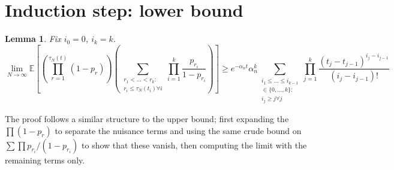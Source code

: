 \documentclass{article}
\newtheorem{lemma}{Lemma}
\newcommand{\E}{\mathbb{E}}
\newcommand{\1}[1]{\mathbbm{1}_{#1}}
\begin{document}
\section*{Induction step: lower bound}
\begin{lemma}\label{thm:induction_LB}
Fix $i_0=0$, $i_k=k$.
\begin{equation}
\lim_{N\to\infty} \E \left[ \left( \prod_{r=1}^{\tau_N(t)} (1-p_r) \right) \left( \sum_{\substack{r_1<\dots<r_k :\\ r_i\leq \tau_N(t_i) \forall i}} \prod_{i=1}^k \frac{p_{r_i}}{1-p_{r_i}} \right) \right] 
\geq e^{-\alpha_n t} \alpha_n^k \sum_{\substack{i_1\leq \dots\leq i_{k-1}\\ \in \{0,\dots,k\} :\\ i_j \geq j \forall j}} \prod_{j=1}^k \frac{(t_j - t_{j-1})^{i_j - i_{j-1}}}{(i_j - i_{j-1})! }
\end{equation}
\end{lemma}
The proof follows a similar structure to the upper bound; first expanding the $\prod (1-p_r)$ to separate the nuisance terms and using the same crude bound on $\sum \prod p_{r_i} / (1- p_{r_i})$ to show that these vanish, then computing the limit with the remaining terms only.
\end{document}
